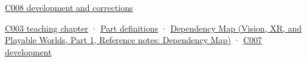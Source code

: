 \hypertarget{appendix-6af5921bc853-source-and-navigation}{}

\hyperref[appendix-fd090d982a15-m008---parts-113-126]{C008 development and corrections}

\hyperref[01-foundations-i-ch002-where-the-bytes-live]{C003 teaching chapter} · \hyperref[appendix-fd090d982a15-m003---parts-41-60]{Part definitions} · \href{../07-Vision-XR-and-Playable-Worlds-P01/main.pdf\#nameddest=appendix-4ad47bdd269a}{Dependency Map (Vision, XR, and Playable Worlds, Part 1, Reference notes: Dependency Map)} · \hyperref[01-foundations-i-ch003-bringing-the-object-model-back-to-bytes]{C007 development}
